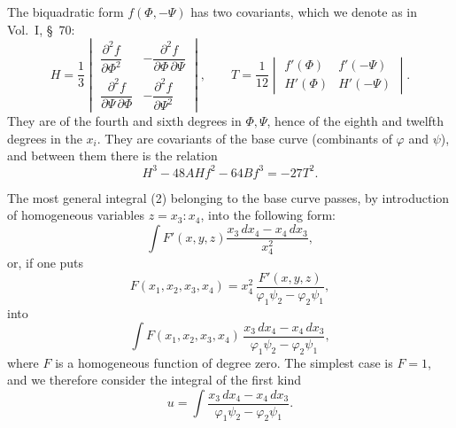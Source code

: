 \documentclass[11pt]{article}
\begin{document}
The biquadratic form $f(\Phi,-\Psi)$ has two covariants, which we denote as in Vol.~I, \S~70:
\begin{equation}
H=\frac13
\begin{vmatrix}
\dfrac{\partial^2f}{\partial\Phi^2}&-\dfrac{\partial^2f}{\partial\Phi\,\partial\Psi}\\[0.5em]
\dfrac{\partial^2f}{\partial\Psi\,\partial\Phi}&-\dfrac{\partial^2f}{\partial\Psi^2}
\end{vmatrix},
\qquad
T=\frac1{12}
\begin{vmatrix}
f'(\Phi)&f'(-\Psi)\\
H'(\Phi)&H'(-\Psi)
\end{vmatrix}.
\tag{24}
\end{equation}
They are of the fourth and sixth degrees in $\Phi,\Psi$, hence of the eighth and twelfth degrees in the $x_i$. They are covariants of the base curve (combinants of $\varphi$ and $\psi$), and between them there is the relation
\begin{equation}
H^3-48AH f^2-64B f^3=-27T^2.
\tag{25}
\end{equation}

The most general integral (2) belonging to the base curve passes, by introduction of homogeneous variables $z=x_3:x_4$, into the following form:
\[
\int F'(x,y,z)\frac{x_3\,dx_4-x_4\,dx_3}{x_4^2},
\]
or, if one puts
\[
F(x_1,x_2,x_3,x_4)=x_4^2\,\frac{F'(x,y,z)}{\varphi_1\psi_2-\varphi_2\psi_1},
\]
into
\[
\int F(x_1,x_2,x_3,x_4)\,
\frac{x_3\,dx_4-x_4\,dx_3}{\varphi_1\psi_2-\varphi_2\psi_1},
\]
where $F$ is a homogeneous function of degree zero. The simplest case is $F=1$, and we therefore consider the integral of the first kind
\begin{equation}
u=\int \frac{x_3\,dx_4-x_4\,dx_3}{\varphi_1\psi_2-\varphi_2\psi_1}.
\tag{26}
\end{equation}
\end{document}
